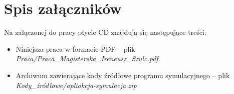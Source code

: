 \chapter*{Spis załączników}

Na załączonej do pracy płycie CD znajdują się następujące treści:
\begin{itemize}
	\item Niniejsza praca w formacie PDF -- plik\\ \textit{Praca/Praca\_Magisterska\_Ireneusz\_Szulc.pdf}.

	\item Archiwum zawierające kody źródłowe programu symulacyjnego -- plik\\ \textit{Kody\_źródłowe/apliakcja-symulacja.zip}

\end{itemize}
